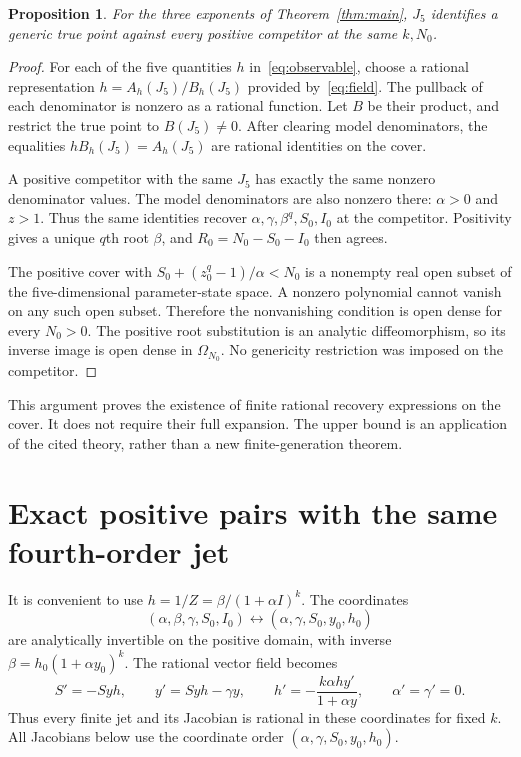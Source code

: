 \documentclass[10pt,a4paper]{article}
\newtheorem{proposition}[theorem]{Proposition}
\begin{document}
\begin{proposition}
\label{prop:upper}
For the three exponents of Theorem~\ref{thm:main}, $J_5$ identifies
a generic true point against every positive competitor at the same
$k,N_0$.
\end{proposition}
\begin{proof}
For each of the five quantities $h$ in~\eqref{eq:observable},
choose a rational representation
$h=A_h(J_5)/B_h(J_5)$ provided by~\eqref{eq:field}.
The pullback of each denominator is nonzero as a rational function.
Let $B$ be their product, and restrict the true point to $B(J_5)\ne0$.
After clearing model denominators, the equalities
$hB_h(J_5)=A_h(J_5)$ are rational identities on the cover.

A positive competitor with the same $J_5$ has exactly the same
nonzero denominator values. The model denominators are also nonzero
there: $\alpha>0$ and $z>1$. Thus the same identities recover
$\alpha,\gamma,\beta^q,S_0,I_0$ at the competitor. Positivity gives a
unique $q$th root $\beta$, and $R_0=N_0-S_0-I_0$ then agrees.

The positive cover with
$S_0+(z_0^q-1)/\alpha<N_0$ is a nonempty real open subset of the
five-dimensional parameter-state space. A nonzero polynomial cannot
vanish on any such open subset. Therefore the nonvanishing condition
is open dense for every $N_0>0$. The positive root substitution is an
analytic diffeomorphism, so its inverse image is open dense in
$\Omega_{N_0}$. No genericity restriction was imposed on the competitor.
\end{proof}
This argument proves the existence of finite rational recovery
expressions on the cover. It does not require their full expansion.
The upper bound is an application of the cited theory, rather than a
new finite-generation theorem.

\section{Exact positive pairs with the same fourth-order jet}
\label{sec:certificates}
It is convenient to use $h=1/Z=\beta/(1+\alpha I)^k$.
The coordinates
\[
(\alpha,\beta,\gamma,S_0,I_0)\longleftrightarrow
(\alpha,\gamma,S_0,y_0,h_0)
\]
are analytically invertible on the positive domain, with inverse
$\beta=h_0(1+\alpha y_0)^k$. The rational vector field becomes
\begin{equation}
S'=-Syh,\qquad y'=Syh-\gamma y,\qquad
h'=-\frac{k\alpha h y'}{1+\alpha y},\qquad
\alpha'=\gamma'=0.
\label{eq:hmodel}
\end{equation}
Thus every finite jet and its Jacobian is rational in these coordinates
for fixed $k$. All Jacobians below use the coordinate order
$(\alpha,\gamma,S_0,y_0,h_0)$.
\end{document}
